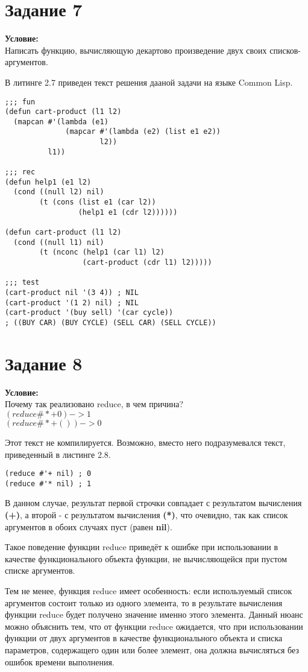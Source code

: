 \section{Задание \No{}7}
\textbf{Условие:}\\Написать функцию, вычисляющую декартово произведение двух своих списков-аргументов.

В литинге 2.7 приведен текст решения дааной задачи на языке Common Lisp.

\begin{lstlisting}[caption={Задание \No{}7}]
;;; fun
(defun cart-product (l1 l2)
  (mapcan #'(lambda (e1)
              (mapcar #'(lambda (e2) (list e1 e2))
                      l2))
          l1))

;;; rec
(defun help1 (e1 l2)
  (cond ((null l2) nil)
        (t (cons (list e1 (car l2))
                 (help1 e1 (cdr l2))))))

(defun cart-product (l1 l2)
  (cond ((null l1) nil)
        (t (nconc (help1 (car l1) l2)
                  (cart-product (cdr l1) l2)))))

;;; test
(cart-product nil '(3 4)) ; NIL
(cart-product '(1 2) nil) ; NIL
(cart-product '(buy sell) '(car cycle))
; ((BUY CAR) (BUY CYCLE) (SELL CAR) (SELL CYCLE))
\end{lstlisting}

\section{Задание \No{}8}
\textbf{Условие:}\\Почему так реализовано reduce, в чем причина?\\$(reduce \#*+0) -> 1$\\$(reduce \#*+ ()) -> 0$

Этот текст не компилируется. Возможно, вместо него подразумевался текст, приведенный в листинге 2.8.
\begin{lstlisting}[caption={Задание \No{}8}]
(reduce #'+ nil) ; 0
(reduce #'* nil) ; 1
\end{lstlisting}

В данном случае, результат первой строчки совпадает с результатом вычисления \textbf{(+)}, а второй - с результатом вычисления \textbf{(*)}, что очевидно, так как список аргументов в обоих случаях пуст (равен \textbf{nil}).

Такое поведение функции reduce приведёт к ошибке при использовании в качестве функционального объекта функции, не вычисляющейся при пустом списке аргументов.

Тем не менее, функция reduce имеет особенность: если используемый список аргументов состоит только из одного элемента, то в результате вычисления функции reduce будет получено значение именно этого элемента. Данный нюанс можно объяснить тем, что от функции reduce ожидается, что при использовании функции от двух аргументов в качестве функционального объекта и списка параметров, содержащего один или более элемент, она должна вычисляться без ошибок времени выполнения.

